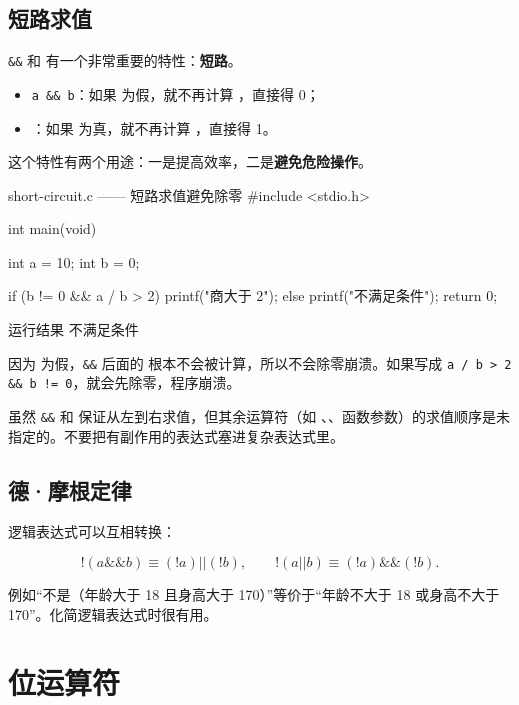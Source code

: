 \subsection{短路求值}

\texttt{\&\&} 和 \code{||} 有一个非常重要的特性：\textbf{短路}。

\begin{itemize}
  \item \texttt{a \&\& b}：如果  为假，就不再计算 ，直接得 0；
  \item {}：如果  为真，就不再计算 ，直接得 1。
\end{itemize}

这个特性有两个用途：一是提高效率，二是\textbf{避免危险操作}。

\begin{codebox}{short-circuit.c —— 短路求值避免除零}
#include <stdio.h>

int main(void)
{
    int a = 10;
    int b = 0;

    if (b != 0 && a / b > 2) {
        printf("商大于 2\n");
    } else {
        printf("不满足条件\n");
    }
    return 0;
}
\end{codebox}

\begin{outbox}{运行结果}
不满足条件
\end{outbox}

因为  为假，\texttt{\&\&} 后面的  根本不会被计算，所以不会除零崩溃。如果写成 \texttt{a / b > 2 \&\& b != 0}，就会先除零，程序崩溃。

\begin{pitfall}
虽然 \texttt{\&\&} 和 \code{||} 保证从左到右求值，但其余运算符（如 \code{+}、\code{*}、函数参数）的求值顺序是未指定的。不要把有副作用的表达式塞进复杂表达式里。
\end{pitfall}

\subsection{德·摩根定律}

逻辑表达式可以互相转换：

\[
!(a \&\& b) \equiv (!a) || (!b), \qquad
!(a || b) \equiv (!a) \&\& (!b).
\]

例如“不是（年龄大于 18 且身高大于 170）”等价于“年龄不大于 18 或身高不大于 170”。化简逻辑表达式时很有用。

\section{位运算符}

